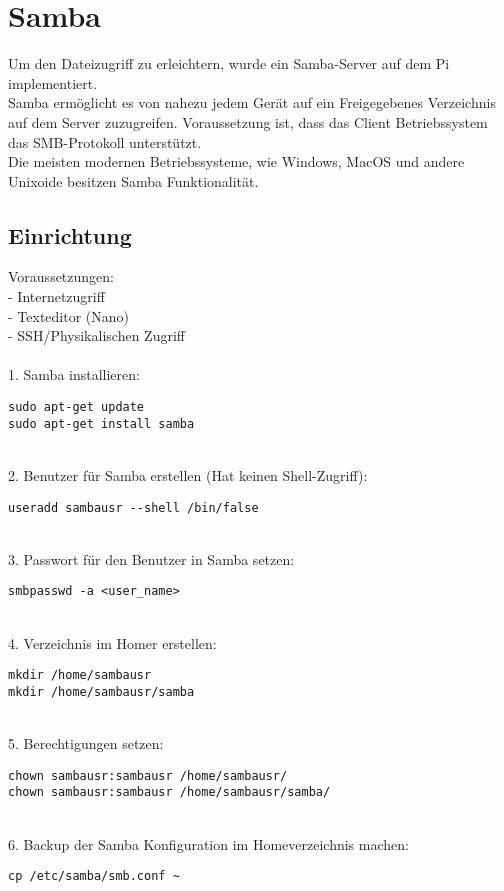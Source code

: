 \section{Samba}
Um den Dateizugriff zu erleichtern, wurde ein Samba-Server auf dem Pi implementiert.\\
Samba ermöglicht es von nahezu jedem Gerät auf ein Freigegebenes Verzeichnis auf dem Server zuzugreifen. Voraussetzung ist, dass das Client Betriebssystem das SMB-Protokoll unterstützt.\\
Die meisten modernen Betriebssysteme, wie Windows, MacOS und andere Unixoide besitzen Samba Funktionalität.\\

\subsection{Einrichtung}
Voraussetzungen:\\
- Internetzugriff\\
- Texteditor (Nano)\\
- SSH/Physikalischen Zugriff\\
\\
1. Samba installieren:
\begin{lstlisting}
sudo apt-get update
sudo apt-get install samba
\end{lstlisting}
~\\
2. Benutzer für Samba erstellen (Hat keinen Shell-Zugriff):
\begin{lstlisting}
useradd sambausr --shell /bin/false
\end{lstlisting}
~\\
3. Passwort für den Benutzer in Samba setzen:
\begin{lstlisting}
smbpasswd -a <user_name>
\end{lstlisting}
~\\
4. Verzeichnis im Homer erstellen:
\begin{lstlisting}
mkdir /home/sambausr
mkdir /home/sambausr/samba
\end{lstlisting}
~\\
5. Berechtigungen setzen:
\begin{lstlisting}
chown sambausr:sambausr /home/sambausr/
chown sambausr:sambausr /home/sambausr/samba/
\end{lstlisting}
~\\
6. Backup der Samba Konfiguration im Homeverzeichnis machen:
\begin{lstlisting}
cp /etc/samba/smb.conf ~
\end{lstlisting}
